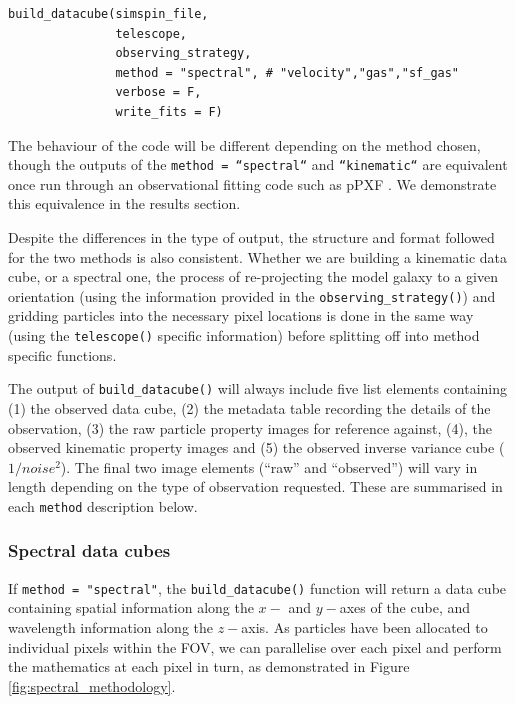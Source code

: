 \documentclass[
  journal=pasa,
  manuscript=research-paper, %
  year=2020,
  volume=37,
]{cup-journal}
\newcommand{\telescope}[1]{\texttt{telescope()}#1}
\newcommand{\observingstrategy}[1]{\texttt{observing\_strategy()}#1}
\newcommand{\builddatacube}[1]{\texttt{build\_datacube()}#1}
\begin{document}
\begin{lstlisting}[basicstyle=\fontsize{6}{8}\selectfont\ttfamily]
build_datacube(simspin_file,              
               telescope,           
               observing_strategy,  
               method = "spectral", # "velocity","gas","sf_gas"
               verbose = F, 
               write_fits = F)  
\end{lstlisting}

The behaviour of the code will be different depending on the method chosen, though the outputs of the \texttt{method = ``spectral``} and \texttt{``kinematic``} are equivalent once run through an observational fitting code such as pPXF \citep{Cappellari2004ParametricLikelihood, Cappellari2017ImprovingFunctions}.
We demonstrate this equivalence in the results section. 

Despite the differences in the type of output, the structure and format followed for the two methods is also consistent. 
Whether we are building a kinematic data cube, or a spectral one, the process of re-projecting the model galaxy to a given orientation (using the information provided in the \observingstrategy) and gridding particles into the necessary pixel locations is done in the same way (using the \telescope{} specific information) before splitting off into method specific functions. 

The output of \builddatacube{} will always include five list elements containing (1) the observed data cube, (2) the metadata table recording the details of the observation, (3) the raw particle property images for reference against, (4), the observed kinematic property images and (5) the observed inverse variance cube ($1/noise^2$).
The final two image elements (``raw'' and ``observed'')  will vary in length depending on the type of observation requested. 
These are summarised in each \texttt{method} description below. 

\subsubsection{Spectral data cubes} \label{sec:spectral_cubes}

If \texttt{method = "spectral"}, the \builddatacube{} function will return a data cube containing spatial information along the $x-$ and $y-$axes of the cube, and wavelength information along the $z-$axis.  
As particles have been allocated to individual pixels within the FOV, we can parallelise over each pixel and perform the mathematics at each pixel in turn, as demonstrated in Figure \ref{fig:spectral_methodology}.
\end{document}
